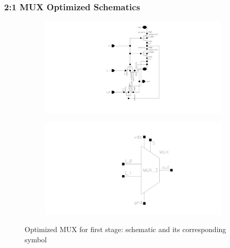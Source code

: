 \documentclass[12pt]{article}
\begin{document}
\subsubsection*{2:1 MUX Optimized Schematics}

\begin{figure}[H]
    \centering
    \begin{subfigure}[b]{0.48\textwidth}
        \centering
        \includegraphics[width=\textwidth]{writeup/figures/mux_w0_opt.png}
        \caption{}
        \label{fig:mux_w0_opt}
    \end{subfigure}
    \hfill
    \begin{subfigure}[b]{0.48\textwidth}
        \centering
        \includegraphics[width=\textwidth]{writeup/figures/mux_w0_opt_sym.png}
        \caption{}
        \label{fig:mux_w0_opt_sym}
    \end{subfigure}
    \caption{Optimized MUX for first stage: schematic and its corresponding symbol}
    \label{fig:mux0_opt_comparison}
\end{figure}
\end{document}
